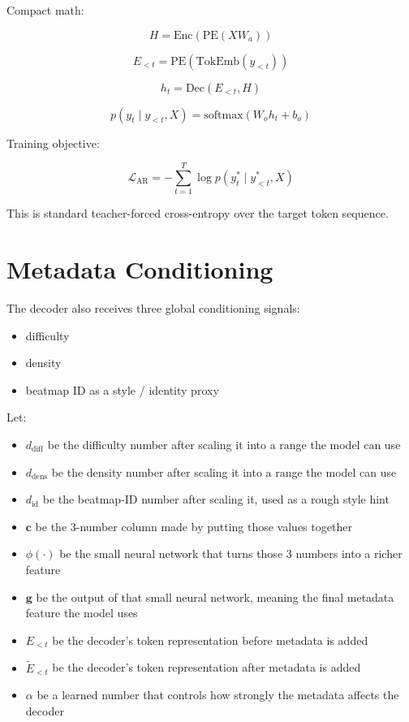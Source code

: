 \documentclass[11pt]{article}
\begin{document}
Compact math:

\[
H = \mathrm{Enc}(\mathrm{PE}(X W_a))
\]

\[
E_{<t} = \mathrm{PE}(\mathrm{TokEmb}(y_{<t}))
\]

\[
h_t = \mathrm{Dec}(E_{<t}, H)
\]

\[
p(y_t \mid y_{<t}, X) = \mathrm{softmax}(W_o h_t + b_o)
\]

Training objective:

\[
\mathcal{L}_{\mathrm{AR}} = - \sum_{t=1}^{T} \log p(y_t^{\ast} \mid y_{<t}^{\ast}, X)
\]

This is standard teacher-forced cross-entropy over the target token sequence.

\section*{Metadata Conditioning}

The decoder also receives three global conditioning signals:

\begin{itemize}[leftmargin=1.5em]
    \item difficulty
    \item density
    \item beatmap ID as a style / identity proxy
\end{itemize}

Let:

\begin{itemize}[leftmargin=1.5em]
    \item $d_{\mathrm{diff}}$ be the difficulty number after scaling it into a range the model can use
    \item $d_{\mathrm{dens}}$ be the density number after scaling it into a range the model can use
    \item $d_{\mathrm{id}}$ be the beatmap-ID number after scaling it, used as a rough style hint
    \item $\mathbf{c}$ be the 3-number column made by putting those values together
    \item $\phi(\cdot)$ be the small neural network that turns those 3 numbers into a richer feature
    \item $\mathbf{g}$ be the output of that small neural network, meaning the final metadata feature the model uses
    \item $E_{<t}$ be the decoder's token representation before metadata is added
    \item $\tilde{E}_{<t}$ be the decoder's token representation after metadata is added
    \item $\alpha$ be a learned number that controls how strongly the metadata affects the decoder
\end{itemize}
\end{document}
